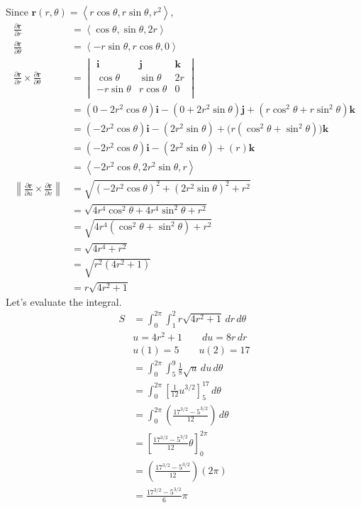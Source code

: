 \documentclass{article}
\newcommand{\lrp}[1]{\left( #1 \right)}
\newcommand{\lra}[1]{\left\langle #1 \right\rangle}
\newcommand{\lrb}[1]{\left[ #1 \right]}
\newcommand{\norm}[1]{\left\lVert #1 \right\rVert}
\renewcommand{\i}[0]{\mathbf{i}}
\renewcommand{\j}[0]{\mathbf{j}}
\renewcommand{\k}[0]{\mathbf{k}}
\renewcommand{\r}[0]{\mathbf{r}}
\begin{document}
Since $\displaystyle \r(r,\theta)=\lra{r\cos\theta, r\sin\theta, r^2}$,
\begin{align*}
    \frac{\partial \r}{\partial r}&=\lra{\cos\theta, \sin\theta, 2r}\\
    \frac{\partial \r}{\partial \theta}&=\lra{-r\sin\theta, r\cos\theta,0}\\
    \frac{\partial \r}{\partial r}\times \frac{\partial \r}{\partial \theta}&=\begin{vmatrix}
\mathbf{i} & \mathbf{j} & \mathbf{k}\\
\cos\theta & \sin\theta& 2r\\
-r\sin\theta& r\cos\theta & 0\\
\end{vmatrix}\\
&=\lrp{0-2r^2\cos\theta}\i-\lrp{0+2r^2\sin\theta}\j+\lrp{r\cos^2\theta+r\sin^2\theta}\k\\
&=\lrp{-2r^2\cos\theta}\i-\lrp{2r^2\sin\theta}+\Big(r\lrp{\cos^2\theta+\sin^2\theta}\Big)\k\\
&=\lrp{-2r^2\cos\theta}\i-\lrp{2r^2\sin\theta}+\lrp{r}\k\tag{$\cos^2\theta+\sin^2\theta=1$}\\
&=\lra{-2r^2\cos\theta,2r^2\sin\theta,r}\\
\norm{\frac{\partial \r}{\partial u}\times \frac{\partial \r}{\partial v}}&=\sqrt{\lrp{-2r^2\cos\theta}^2+\lrp{2r^2\sin\theta}^2+r^2}\\
&=\sqrt{4r^4\cos^2\theta+4r^4\sin^2\theta+r^2}\\
&=\sqrt{4r^4\lrp{\cos^2\theta+\sin^2\theta}+r^2}\\
&=\sqrt{4r^4+r^2}\tag{$\cos^2\theta+\sin^2\theta=1$}\\
&=\sqrt{r^2\lrp{4r^2+1}}\\
&=r\sqrt{4r^2+1}\tag{$r\geq 0$ is always true}
\end{align*}
Let's evaluate the integral.
\begin{align*}
    S&=\int_0^{2\pi}\int_1^2 r\sqrt{4r^2+1}\,dr\,d\theta\\
    &u=4r^2+1\hspace{2em}du=8r\,dr\\
    &u(1)=5\hspace{2em}u(2)=17\\
    &=\int_0^{2\pi}\int_5^9 \frac{1}{8}\sqrt{u}\,du\,d\theta\\
    &=\int_0^{2\pi}\lrb{\frac{1}{12}u^{3/2}}_5^{17}\,d\theta\\
    &=\int_0^{2\pi}\lrp{\frac{17^{3/2}-5^{3/2}}{12}}\,d\theta\\
    &=\lrb{\frac{17^{3/2}-5^{3/2}}{12}\theta}_0^{2\pi}\\
    &=\lrp{\frac{17^{3/2}-5^{3/2}}{12}}\lrp{2\pi}\\
    &=\boxed{\frac{17^{3/2}-5^{3/2}}{6}\pi}
\end{align*}
\end{document}
